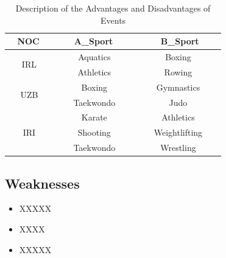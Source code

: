 \documentclass{mcmthesis}
\begin{document}
\begin{table}
\centering
\caption{Description of the Advantages and Disadvantages of Events}
\begin{tabular}{|c|c|c|} 
\hline
\textbf{~ NOC~~}     & \textbf{~ ~ A\_Sport~ ~~} & \textbf{~ ~ ~B\_Sport~ ~~}  \\ 
\hline
\multirow{2}{*}{IRL} & Aquatics                  & Boxing                      \\ 
\cline{2-3}
                     & Athletics                 & Rowing                      \\ 
\hline
\multirow{2}{*}{UZB} & Boxing                    & Gymnastics                  \\ 
\cline{2-3}
                     & Taekwondo                 & Judo                        \\ 
\hline
\multirow{3}{*}{IRI} & Karate                    & Athletics                   \\ 
\cline{2-3}
                     & Shooting                  & Weightlifting               \\ 
\cline{2-3}
                     & Taekwondo                 & Wrestling                   \\
\hline
\end{tabular}
\end{table}

\subsection{Weaknesses}

\begin{itemize}
\item XXXXX

\item XXXX

\item XXXXX
\end{itemize}

\newpage
\end{document}

